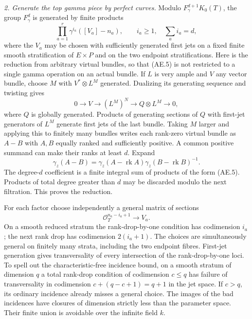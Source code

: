 \emph{2. Generate the top gamma piece by perfect curves.}
Modulo $F_\gamma^{d+1}K_0(T)$, the group $F_\gamma^d$ is generated
by finite products
\begin{equation}
          \prod_{a=1}^r\gamma^{i_a}([V_a]-n_a),
       \qquad i_a\geq1,\quad \sum_a i_a=d,             \tag{AE.5}
\end{equation}
where the $V_a$ may be chosen with sufficiently generated first
jets on a fixed finite smooth stratification of $E\times P$ and
on the two endpoint stratifications.  Here is the reduction from
arbitrary virtual bundles, so that (AE.5) is not restricted to a
single gamma operation on an actual bundle.  If $L$ is very ample
and $V$ any vector bundle, choose $M$ with $V^*\otimes L^M$
generated.  Dualizing its generating sequence and twisting gives
\[
 0\longrightarrow V\longrightarrow (L^M)^N
        \longrightarrow Q\otimes L^M\longrightarrow0,
\]
where $Q$ is globally generated.  Products of generating sections
of $Q$ with first-jet generators of $L^M$ generate first jets of
the last bundle.  Taking $M$ larger and applying this to finitely
many bundles writes each rank-zero virtual bundle as $A-B$ with
$A,B$ equally ranked and sufficiently positive.  A common positive
summand can make their ranks at least $d$.  Expand
\[
       \gamma_z(A-B)=\gamma_z(A-\operatorname{rk}A)
                       \gamma_z(B-\operatorname{rk}B)^{-1}.
\]
The degree-$d$ coefficient is a finite integral sum of products of
the form (AE.5).  Products of total degree greater than $d$ may be
discarded modulo the next filtration.  This proves the reduction.

For each factor choose independently a general matrix of sections
\[
              \mathcal O_T^{n_a-i_a+1}\longrightarrow V_a.
\]
On a smooth reduced stratum the rank-drop-by-one condition has
codimension $i_a$; the next rank drop has codimension
$2(i_a+1)$.  The choices are simultaneously general on finitely
many strata, including the two endpoint fibres.  First-jet
generation gives transversality of every intersection of the
rank-drop-by-one loci.  To spell out the characteristic-free
incidence bound, on a smooth stratum of dimension $q$ a total
rank-drop condition of codimension $c\leq q$ has failure of
transversality in codimension $c+(q-c+1)=q+1$ in the jet space.
If $c>q$, its ordinary incidence already misses a general choice.
The images of the bad incidences have closures of dimension
strictly less than the parameter space.  Their finite union is
avoidable over the infinite field $k$.

